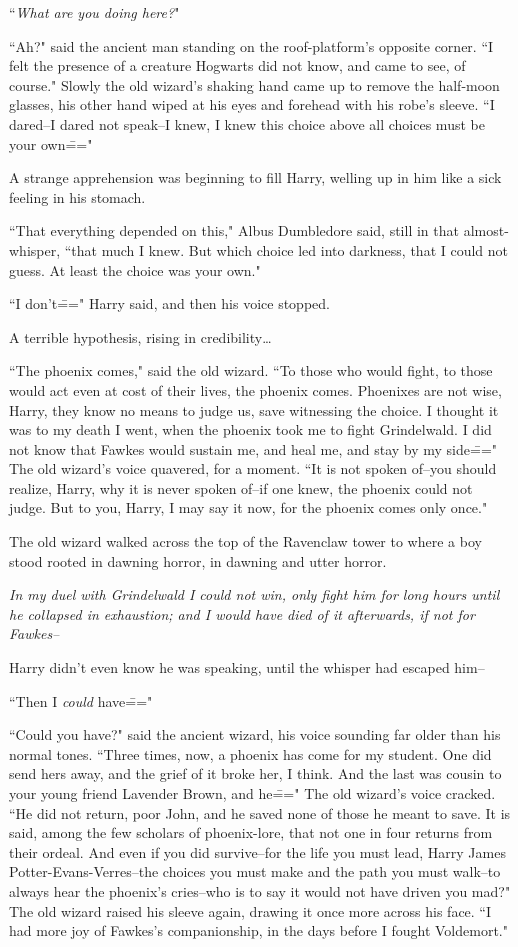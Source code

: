 ``\emph{What are you doing here?}"

``Ah?" said the ancient man standing on the roof-platform's opposite corner. ``I felt the presence of a creature Hogwarts did not know, and came to see, of course." Slowly the old wizard's shaking hand came up to remove the half-moon glasses, his other hand wiped at his eyes and forehead with his robe's sleeve. ``I dared\---I dared not speak\---I knew, I knew this choice above all choices must be your own\==="

A strange apprehension was beginning to fill Harry, welling up in him like a sick feeling in his stomach.

``That everything depended on this," Albus Dumbledore said, still in that almost-whisper, ``that much I knew. But which choice led into darkness, that I could not guess. At least the choice was your own."

``I don't\===" Harry said, and then his voice stopped.

A terrible hypothesis, rising in credibility{\ldots}

``The phoenix comes," said the old wizard. ``To those who would fight, to those would act even at cost of their lives, the phoenix comes. Phoenixes are not wise, Harry, they know no means to judge us, save witnessing the choice. I thought it was to my death I went, when the phoenix took me to fight Grindelwald. I did not know that Fawkes would sustain me, and heal me, and stay by my side\===" The old wizard's voice quavered, for a moment. ``It is not spoken of\---you should realize, Harry, why it is never spoken of\---if one knew, the phoenix could not judge. But to you, Harry, I may say it now, for the phoenix comes only once."

The old wizard walked across the top of the Ravenclaw tower to where a boy stood rooted in dawning horror, in dawning and utter horror.

\emph{In my duel with Grindelwald I could not win, only fight him for long hours until he collapsed in exhaustion; and I would have died of it afterwards, if not for Fawkes\---}

Harry didn't even know he was speaking, until the whisper had escaped him\---

``Then I \emph{could} have\==="

``Could you have?" said the ancient wizard, his voice sounding far older than his normal tones. ``Three times, now, a phoenix has come for my student. One did send hers away, and the grief of it broke her, I think. And the last was cousin to your young friend Lavender Brown, and he\===" The old wizard's voice cracked. ``He did not return, poor John, and he saved none of those he meant to save. It is said, among the few scholars of phoenix-lore, that not one in four returns from their ordeal. And even if you did survive\---for the life you must lead, Harry James Potter-Evans-Verres\---the choices you must make and the path you must walk\---to always hear the phoenix's cries\---who is to say it would not have driven you mad?" The old wizard raised his sleeve again, drawing it once more across his face. ``I had more joy of Fawkes's companionship, in the days before I fought Voldemort."

